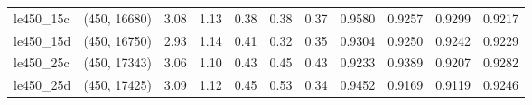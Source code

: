 \begin{tabular}{llrrrrrrrrr}
 le450\_15c & (450, 16680) &  3.08 & 1.13 & 0.38 &  0.38 &   0.37 &   0.9580 &   0.9257 &     0.9299 &      0.9217 \\
 le450\_15d & (450, 16750) &  2.93 & 1.14 & 0.41 &  0.32 &   0.35 &   0.9304 &   0.9250 &     0.9242 &      0.9229 \\
 le450\_25c & (450, 17343) &  3.06 & 1.10 & 0.43 &  0.45 &   0.43 &   0.9233 &   0.9389 &     0.9207 &      0.9282 \\
 le450\_25d & (450, 17425) &  3.09 & 1.12 & 0.45 &  0.53 &   0.34 &   0.9452 &   0.9169 &     0.9119 &      0.9246 \\
\bottomrule
\end{tabular}

